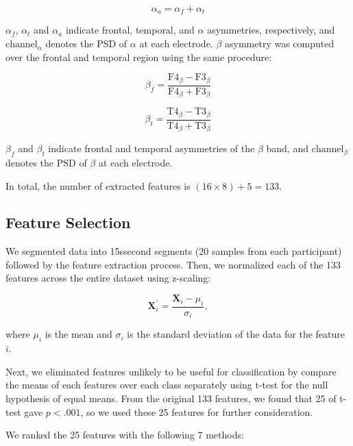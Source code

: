 \documentclass[pdflatex,sn-mathphys]{sn-jnl}%
\theoremstyle{thmstyleone}%
\theoremstyle{thmstyletwo}%
\theoremstyle{thmstylethree}%
\begin{document}
\begin{equation} \label{eq:5}
   \alpha_{a} ={\alpha_{f}+\alpha_{t}}
\end{equation}

$\alpha_{f}$, $\alpha_{t}$ and $\alpha_{a}$ indicate frontal, temporal, and $\alpha$ asymmetries, respectively, and $\text{channel}_\alpha$ denotes the PSD of $\alpha$ at each electrode. $\beta$ asymmetry was computed over the frontal and temporal region using the same procedure:

\begin{equation} \label{eq:6}
    \beta_{f} =\frac{ \text{F4}_{\beta} - \text{F3}_{\beta} }{ \text{F4}_{\beta} + \text{F3}_{\beta} }
\end{equation}

\begin{equation} \label{eq:7}
    \beta_{t} =\frac{ \text{T4}_{\beta} - \text{T3}_{\beta} }{ \text{T4}_{\beta} + \text{T3}_{\beta} }
\end{equation}

$\beta_{f}$ and $\beta_{t}$ indicate frontal and temporal asymmetries of the $\beta$ band, and $\text{channel}_\beta$ denotes the PSD of $\beta$ at each electrode.

In total, the number of extracted features is $(16 \times 8) + 5 = 133$.

\subsection{Feature Selection}\label{sec:feature_selection}
We segmented data into 15ssecond segments (20 samples from each participant) followed by the feature extraction process. Then, we normalized each of the 133 features across the entire dataset using z-scaling:

\begin{equation} \label{eq:normalized}
   \mathbf{X}^{\prime}_i = \frac{\mathbf{X}_i - \mu_i}{\sigma_i},
\end{equation}

where $\mu_i$ is the mean and $\sigma_i$ is the standard deviation of the data for the feature $i$.

Next, we eliminated features unlikely to be useful for classification by compare the means of each features over each class separately using t-test for the null hypothesis of equal means. From the original 133 features, we found that 25 of t-test gave $p < .001$, so we used these 25 features for further consideration.

We ranked the 25 features with the following 7 methods:
\end{document}
